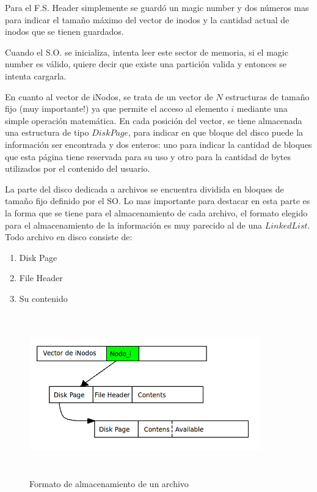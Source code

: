 \documentclass[english]{article}
\begin{document}
Para el F.S. Header simplemente se guardó un magic number y dos números
mas para indicar el tamaño máximo del vector de inodos y la cantidad
actual de inodos que se tienen guardados.

Cuando el S.O. se inicializa, intenta leer este sector de memoria, si
el magic number es válido, quiere decir que existe una partición valida
y entonces se intenta cargarla.

En cuanto al vector de iNodos, se trata de un vector de $N$ estructuras
de tamaño fijo (muy importante!) ya que permite el acceso al elemento
$i$ mediante una simple operación matemática. En cada posición del vector, 
se tiene almacenada una estructura de tipo $DiskPage$, para indicar en que 
bloque del disco puede la información ser encontrada y dos enteros: uno para 
indicar la cantidad de bloques que esta página tiene reservada para su uso y 
otro para la cantidad de bytes utilizados por el contenido del usuario.

La parte del disco dedicada a archivos se encuentra dividida en bloques
de tamaño fijo definido por el SO. Lo mas importante para destacar
en esta parte es la forma que se tiene para el almacenamiento de cada
archivo, el formato elegido para el almacenamiento de la información
es muy parecido al de una $LinkedList$. Todo archivo en disco consiste
de:
\begin{enumerate}
\item Disk Page
\item File Header
\item Su contenido
\end{enumerate}

\begin{figure}[H]
\begin{center}
\includegraphics[width=10cm,height=7cm,keepaspectratio]{Archivo}

\caption{Formato de almacenamiento de un archivo}
\end{center}
\end{figure}
\end{document}
